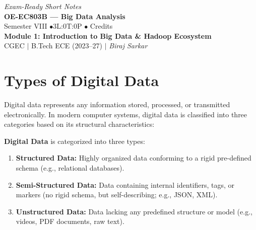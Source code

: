 \documentclass[12pt,a4paper]{article}
\begin{document}
\begin{center}
  \hfill \textit{Exam-Ready Short Notes} \\
  \vspace{6pt}
  {\LARGE\bfseries\color{myred} OE-EC803B --- Big Data Analysis}\\[5pt]
  {\normalsize\color{mydark} Semester VIII \quad$\bullet$\quad 3L:0T:0P \quad$\bullet$ Credits}\\[3pt]
  {\normalsize\color{myteal}\textbf{Module 1: Introduction to Big Data \& Hadoop Ecosystem}}\\[3pt]
  {\small\color{mydark} CGEC \;$|$\; B.Tech ECE (2023--27) \;$|$\; \textit{Biraj Sarkar}}
\end{center}
\vspace{2pt}
\noindent{\color{myred}\rule{\linewidth}{1.5pt}}
\vspace{2pt}

\hypersetup{linkcolor=mydark}
\tableofcontents
\hypersetup{linkcolor=myteal}
\newpage

\section{Types of Digital Data}

Digital data represents any information stored, processed, or transmitted electronically. In modern computer systems, digital data is classified into three categories based on its structural characteristics:

\begin{tcolorbox}[defbox, title={Classification of Digital Data}]
  \textbf{Digital Data} is categorized into three types:
  \begin{enumerate}[leftmargin=*, noitemsep]
    \item \textbf{Structured Data:} Highly organized data conforming to a rigid pre-defined schema (e.g., relational databases).
    \item \textbf{Semi-Structured Data:} Data containing internal identifiers, tags, or markers (no rigid schema, but self-describing; e.g., JSON, XML).
    \item \textbf{Unstructured Data:} Data lacking any predefined structure or model (e.g., videos, PDF documents, raw text).
  \end{enumerate}
\end{tcolorbox}
\end{document}
